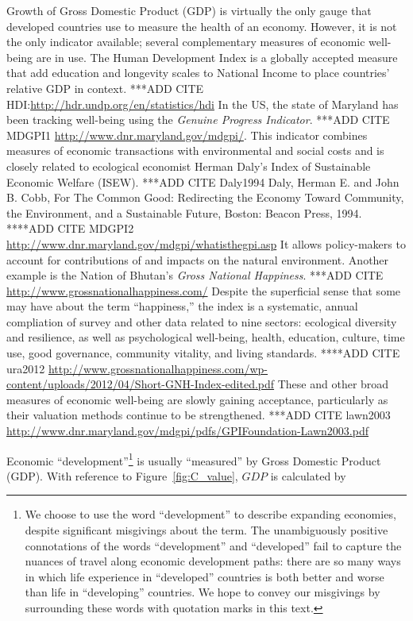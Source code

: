Growth of Gross Domestic Product (GDP) is virtually the only gauge that developed
countries use to measure the health of an economy. However, it is not the only indicator 
available; several complementary measures of economic well-being are in use. The Human Development 
Index is a globally accepted measure that add education and longevity scales to National Income
to place countries' relative GDP in context.\cite{HDI} 
***ADD CITE HDI:\url{http://hdr.undp.org/en/statistics/hdi} In the US, the
state of Maryland has been tracking well-being using the \emph{Genuine Progress Indicator}.\cite{MDGPI1} 
***ADD CITE MDGPI1 \url{http://www.dnr.maryland.gov/mdgpi/}. 
This indicator combines measures of economic transactions with 
environmental and social costs and is closely related to ecological economist Herman Daly's Index of Sustainable Economic Welfare (ISEW).\cite{Daly1994,MDGPI2}
***ADD CITE Daly1994 Daly, Herman E. and John B. Cobb, For The Common Good: Redirecting the Economy
Toward Community, the Environment, and a Sustainable Future, Boston: Beacon Press, 1994.  
****ADD CITE MDGPI2 \url{http://www.dnr.maryland.gov/mdgpi/whatisthegpi.asp}
It allows policy-makers to account for contributions of and impacts on 
the natural environment. Another example is the Nation of Bhutan's \emph{Gross National Happiness}. 
***ADD CITE \url{http://www.grossnationalhappiness.com/} Despite the superficial 
sense that some may have about the term ``happiness,'' the index is a systematic, annual compliation
of  survey and other data related to nine sectors: ecological diversity and resilience,
as well as psychological well-being, health,
education, culture, time use, good governance, community vitality,  and 
living standards.\cite{ura2012} 
****ADD CITE   ura2012  \url{http://www.grossnationalhappiness.com/wp-content/uploads/2012/04/Short-GNH-Index-edited.pdf}
These and other broad measures of economic well-being are slowly gaining acceptance, particularly
as their valuation methods continue to be strengthened.\cite{lawn2003}
***ADD CITE lawn2003 \url{http://www.dnr.maryland.gov/mdgpi/pdfs/GPIFoundation-Lawn2003.pdf}

Economic ``development''\footnote{We choose to use the word ``development'' to
describe expanding economies, despite significant misgivings about the term. 
The unambiguously positive connotations of the words ``development'' and ``developed''
fail to capture the nuances of travel along economic development paths:
there are so many ways in which life experience in ``developed'' countries 
is both better and worse than life in ``developing'' countries.
We hope to convey our misgivings by surrounding these words with quotation marks in this text.}
is usually ``measured''
by Gross Domestic Product (GDP).
With reference to Figure~\ref{fig:C_value}, $GDP$ is calculated by

